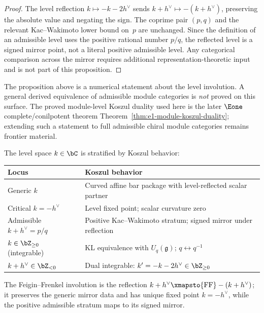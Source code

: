 \begin{proof}
The level reflection $k \mapsto -k-2h^\vee$ sends
$k + h^\vee \mapsto -(k+h^\vee)$, preserving the absolute value and
negating the sign.  The coprime pair $(p,q)$ and the relevant
Kac--Wakimoto lower bound on~$p$ are unchanged.  Since the definition
of an admissible level uses the positive rational number $p/q$, the
reflected level is a signed mirror point, not a literal positive
admissible level.  Any categorical comparison across the mirror
requires additional representation-theoretic input and is not part of
this proposition.
\end{proof}

\begin{remark}
\label{rem:admissible-level-module-frontier}
The proposition above is a numerical statement about the level
involution. A general derived equivalence of admissible module
categories is \emph{not} proved on this surface. The proved
module-level Koszul duality used here is the later
$\Eone$ complete/conilpotent theorem
Theorem~\ref{thm:e1-module-koszul-duality}; extending such a
statement to full admissible chiral module categories remains
frontier material.
\end{remark}

\begin{remark}\label{rem:critical-locus}
The level space $k \in \bC$ is stratified by Koszul behavior:
\begin{center}
\begin{tabular}{ll}
\textbf{Locus} & \textbf{Koszul behavior} \\
\hline
Generic $k$ & Curved affine bar package with level-reflected scalar partner \\
Critical $k = -h^\vee$ & Level fixed point; scalar curvature zero \\
Admissible $k + h^\vee = p/q$ & Positive Kac--Wakimoto stratum; signed mirror under reflection \\
$k \in \bZ_{\geq 0}$ (integrable) & KL equivalence with $U_q(\mathfrak{g})$; $q \leftrightarrow q^{-1}$ \\
$k + h^\vee \in \bZ_{<0}$ & Dual integrable: $k' = -k-2h^\vee \in \bZ_{\geq 0}$
\end{tabular}
\end{center}
The Feigin--Frenkel involution is the reflection
$k + h^\vee \xmapsto{\mathrm{FF}} -(k + h^\vee)$; it preserves the
generic mirror data and has unique fixed point $k=-h^\vee$, while the
positive admissible stratum maps to its signed mirror.
\end{remark}

